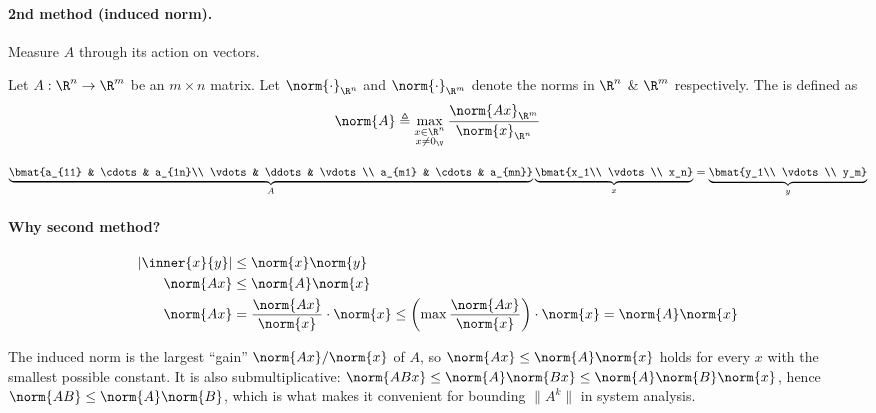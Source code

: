 \paragraph{2nd method (induced norm).} Measure $A$ through its action on vectors.
\begin{definition}
Let $A:\R^n \to \R^m$ be an $m\times n$ matrix. Let $\norm{\cdot}_{\R^n}$ and $\norm{\cdot}_{\R^m}$ denote the norms in $\R^n$ \& $\R^m$ respectively. The  is defined as
\[
\norm{A} \triangleq \max_{\substack{x\in\R^n\\ x\neq 0_{\V}}} \frac{\norm{Ax}_{\R^m}}{\norm{x}_{\R^n}}
\]
\end{definition}
\[
\underbrace{\bmat{a_{11} & \cdots & a_{1n}\\ \vdots & \ddots & \vdots\\ a_{m1} & \cdots & a_{mn}}}_{A}
\underbrace{\bmat{x_1\\ \vdots\\ x_n}}_{x}
=
\underbrace{\bmat{y_1\\ \vdots\\ y_m}}_{y}
\]

\paragraph{Why second method?}
\begin{align*}
|\inner{x}{y}| &\le \norm{x}\norm{y}\\
\norm{Ax} &\le \norm{A}\norm{x}\\
\norm{Ax} &= \frac{\norm{Ax}}{\norm{x}}\cdot\norm{x} \le \left(\max\frac{\norm{Ax}}{\norm{x}}\right)\cdot\norm{x} = \norm{A}\norm{x}
\end{align*}
\begin{insight}
The induced norm is the largest ``gain'' $\norm{Ax}/\norm{x}$ of $A$, so $\norm{Ax}\le\norm{A}\norm{x}$ holds for every $x$ with the smallest possible constant. It is also submultiplicative: $\norm{ABx}\le\norm{A}\norm{Bx}\le\norm{A}\norm{B}\norm{x}$, hence $\norm{AB}\le\norm{A}\norm{B}$, which is what makes it convenient for bounding $\lVert A^k\rVert$ in system analysis.
\end{insight}

